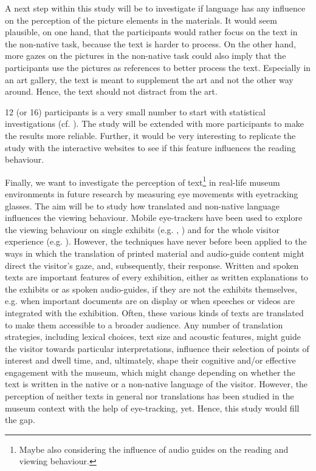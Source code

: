 \documentclass[output=paper]{langscibook}
\begin{document}
A next step within this study will be to investigate if language has any influence on the perception of the picture elements in the materials. It would seem plausible, on one hand, that the participants would rather focus on the text in the non-native task, because the text is harder to process. On the other hand, more gazes on the pictures in the non-native task could also imply that the participants use the pictures as references to better process the text. Especially in an art gallery, the text is meant to supplement the art and not the other way around. Hence, the text should not distract from the art. 


12 (or 16) participants is a very small number to start with statistical investigations (cf. \citealt{o2009eye}). The study will be extended with more participants to make the results more reliable. Further, it would be very interesting to replicate the study with the interactive websites to see if this feature influences the reading behaviour.

Finally, we want to investigate the perception of text\footnote{Maybe also considering the influence of audio guides on the reading and viewing behaviour.} in real-life museum environments in future research by measuring eye movements with eyetracking glasses. The aim will be to study how translated and non-native language influences the viewing behaviour. Mobile eye-trackers have been used to explore the viewing behaviour on single exhibits (e.g. \citealt{walker2017looking}, \citealt{tatler2016looking}) and for the whole visitor experience (e.g. \citealt{eghbal2016use}). However, the techniques have never before been applied to the ways in which the translation of printed material and audio-guide content might direct the visitor’s gaze, and, subsequently, their response. Written and spoken texts are important features of every exhibition, either as written explanations to the exhibits or as spoken audio-guides, if they are not the exhibits themselves, e.g. when important documents are on display or when speeches or videos are integrated with the exhibition. Often, these various kinds of texts are translated to make them accessible to a broader audience. Any number of translation strategies, including lexical choices, text size and acoustic features, might guide the visitor towards particular interpretations, influence their selection of points of interest and dwell time, and, ultimately, shape their cognitive and/or effective engagement with the museum, which might change depending on whether the text is written in the native or a non-native language of the visitor. However, the perception of neither texts in general nor translations has been studied in the museum context with the help of eye-tracking, yet. Hence, this study would fill the gap.

{\sloppy\printbibliography[heading=subbibliography,notkeyword=this]}
\end{document}
